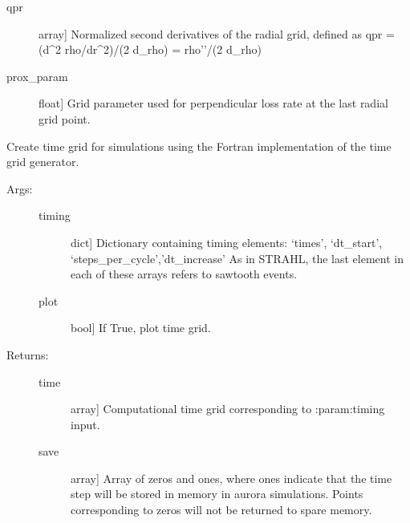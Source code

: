 \documentclass[letterpaper,10pt,english]{sphinxmanual}
\begin{document}
\begin{fulllineitems}
\begin{description}
\begin{description}
\item[{qpr}] \leavevmode{[}array{]}
Normalized second derivatives of the radial grid, defined as 
qpr = (d\textasciicircum{}2 rho/dr\textasciicircum{}2)/(2 d\_rho) = rho’’/(2 d\_rho)

\item[{prox\_param}] \leavevmode{[}float{]}
Grid parameter used for perpendicular loss rate at the last radial grid point.

\end{description}

\end{description}

\end{fulllineitems}


\begin{fulllineitems}
\label{\detokenize{aurora:aurora.grids_utils.create_time_grid}}
Create time grid for simulations using the Fortran implementation
of the time grid generator.
\begin{description}
\item[{Args:}] \leavevmode\begin{description}
\item[{timing}] \leavevmode{[}dict{]}
Dictionary containing timing elements: ‘times’, ‘dt\_start’, ‘steps\_per\_cycle’,’dt\_increase’
As in STRAHL, the last element in each of these arrays refers to sawtooth events.

\item[{plot}] \leavevmode{[}bool{]}
If True, plot time grid.

\end{description}

\item[{Returns:}] \leavevmode\begin{description}
\item[{time}] \leavevmode{[}array{]}
Computational time grid corresponding to :param:timing input.

\item[{save}] \leavevmode{[}array{]}
Array of zeros and ones, where ones indicate that the time step will be stored in memory
in aurora simulations. Points corresponding to zeros will not be returned to spare memory.

\end{description}

\end{description}

\end{fulllineitems}
\end{document}
